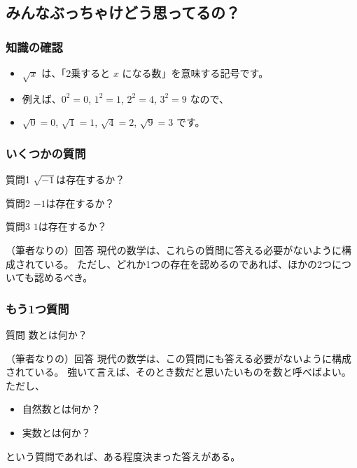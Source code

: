 \documentclass[dvipdfmx]{beamer}
\begin{document}
  \subsection{みんなぶっちゃけどう思ってるの？}

  \begin{frame}
    \frametitle{知識の確認}

    \begin{itemize}
      \item $\sqrt{x}$ は、「2乗すると $x$ になる数」を意味する記号です。
      \item 例えば、$0^2 = 0$, $1^2 = 1$, $2^2 = 4$, $3^2 = 9$ なので、
      \item $\sqrt{0} = 0$, $\sqrt{1} = 1$, $\sqrt{4} = 2$, $\sqrt{9} = 3$ です。
    \end{itemize}

  \end{frame}

  \begin{frame}
    \frametitle{いくつかの質問}

    \begin{block}{質問1}
      $\sqrt{-1}$は存在するか？
    \end{block}

    \pause

    \begin{block}{質問2}
      $-1$は存在するか？
    \end{block}

    \pause

    \begin{block}{質問3}
      $1$は存在するか？
    \end{block}

    \pause

    \begin{block}{（筆者なりの）回答}
      現代の数学は、これらの質問に答える必要がないように構成されている。
      ただし、どれか1つの存在を認めるのであれば、ほかの2つについても認めるべき。
    \end{block}

  \end{frame}

  \begin{frame}
    \frametitle{もう1つ質問}

    \begin{block}{質問}
      数とは何か？
    \end{block}

    \pause

    \begin{block}{（筆者なりの）回答}
      現代の数学は、この質問にも答える必要がないように構成されている。
      強いて言えば、そのとき数だと思いたいものを数と呼べばよい。
      ただし、
      \begin{itemize}
        \item 自然数とは何か？
        \item 実数とは何か？
      \end{itemize}
      という質問であれば、ある程度決まった答えがある。
    \end{block}

  \end{frame}
\end{document}
